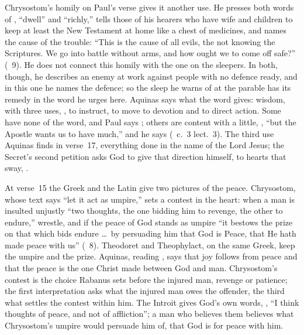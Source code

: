 Chrysostom's homily on Paul's verse gives it another use. He presses both
words of , ``dwell'' and
``richly,'' tells those of his hearers who have wife and children to keep at
least the New Testament at home like a chest of medicines, and names the cause
of the trouble: ``This is the cause of all evils, the not knowing the
Scriptures. We go into battle without arms, and how ought we to come off
safe?'' (\ 9). He does not connect this homily with the
one on the sleepers. In both, though, he describes an enemy at work against
people with no defence ready, and in this one he names the defence; so the
sleep he warns of at the parable has its remedy in the word he urges here.
Aquinas says what the word gives: wisdom, with three uses,
, to instruct, to move to
devotion and to direct action. Some have none of the word, and Paul says
; others are content with a little, , ``but the Apostle wants us to have much,'' and he says
 (\ c.~3 lect.~3). The third use Aquinas
finds in verse~17, everything done in the name of the Lord Jesus; the
Secret's second petition asks God to give that direction himself, to hearts
that sway, .

At verse~15 the Greek and the Latin give two pictures of the peace.
Chrysostom, whose text says ``let it act as umpire,'' sets a contest in the
heart: when a man is insulted unjustly ``two thoughts, the one bidding him to
revenge, the other to endure,'' wrestle, and if the peace of God stands as
umpire ``it bestows the prize on that which bids endure \dots\ by persuading
him that God is Peace, that He hath made peace with us'' (\ 8). Theodoret and Theophylact, on the same Greek, keep the umpire and
the prize. Aquinas, reading , says that joy follows from peace
and that the peace is the one Christ made between God and man. Chrysostom's
contest is the choice Rabanus sets before the injured man, revenge or
patience; the first interpretation asks what the injured man owes the
offender, the third what settles the contest within him. The Introit gives
God's own words, ,
``I think thoughts of peace, and not of affliction''; a man who believes them believes what Chrysostom's umpire would persuade him
of, that God is for peace with him.

